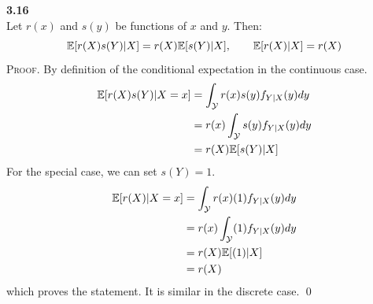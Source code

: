 \bigskip\noindent
\textbf{3.16}\\  %
Let $r(x)$ and $s(y)$ be functions of $x$ and $y$. Then:
$$
\mathbb{E}[r(X)s(Y)|X] = r(X)\mathbb{E}[s(Y)|X], \qquad \mathbb{E}[r(X)|X] = r(X)
$$
\textsc{Proof}. By definition of the conditional expectation in the continuous case.
\begin{align*}
    \mathbb{E}[r(X)s(Y)|X=x] &= \int_{\mathcal{Y}} r(x)s(y)f_{Y|X}(y) dy \\
    &= r(x)\int_{\mathcal{Y}} s(y)f_{Y|X}(y) dy \\
    &= r(X)\mathbb{E}[s(Y)|X]
\end{align*}
For the special case, we can set $s(Y) = 1$.
\begin{align*}
    \mathbb{E}[r(X)|X=x] &= \int_{\mathcal{Y}} r(x)(1)f_{Y|X}(y) dy \\
    &= r(x)\int_{\mathcal{Y}} (1)f_{Y|X}(y) dy \\
    &= r(X)\mathbb{E}[(1)|X] \\
    &= r(X)
\end{align*}
which proves the statement. It is similar in the discrete case. \qed





